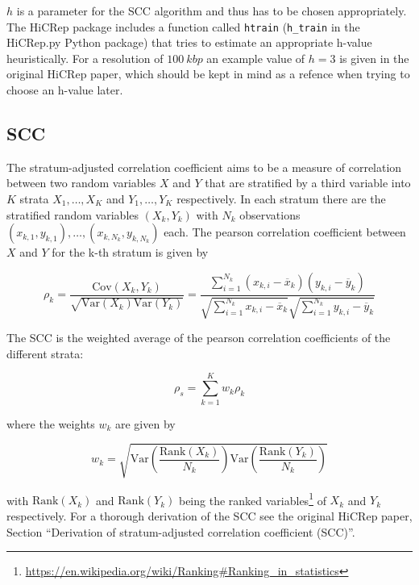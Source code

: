 \(h\) is a parameter for the SCC algorithm and thus has to be chosen appropriately. The HiCRep package includes a function called \verb|htrain| (\verb|h_train| in the HiCRep.py Python package) that tries to estimate an appropriate h-value heuristically. For a resolution of \(\SI{100}{kbp}\) an example value of \( h = 3 \) is given in the original HiCRep paper, which should be kept in mind as a refence when trying to choose an h-value later.


\subsection{SCC} %
\label{subsec:scc}

The stratum-adjusted correlation coefficient aims to be a measure of correlation between two random variables \(X\) and \(Y\) that are stratified by a third variable into \(K\) strata \(X_1, \dots, X_K\) and \(Y_1, \dots, Y_K\) respectively. In each stratum there are the stratified random variables \((X_k, Y_k)\) with \(N_k\) observations \( (x_{k,1}, y_{k,1}), \dots, (x_{k,N_k}, y_{k,N_k}) \) each. The pearson correlation coefficient between \(X\) and \(Y\) for the k-th stratum is given by

\[
  \rho_k = \frac{ \mathrm{Cov}(X_k,Y_k) }{ \sqrt{ \mathrm{Var}(X_k) \mathrm{Var}(Y_k)} } = \frac{ \sum_{i=1}^{N_k} (x_{k,i} - \overbar{x}_k) (y_{k,i} - \overbar{y}_k) }{ \sqrt{ \sum_{i=1}^{N_k} x_{k,i} - \overbar{x}_k } \sqrt{ \sum_{i=1}^{N_k} y_{k,i} - \overbar{y}_k } }
\]

The SCC is the weighted average of the pearson correlation coefficients of the different strata:

\[
  \rho_s = \sum_{k=1}^{K} w_k \rho_k
\]

where the weights \(w_k\) are given by

\[
  w_k = \sqrt{ \mathrm{Var}\left( \frac{ \mathrm{Rank}(X_k) }{ N_k } \right) \mathrm{Var}\left( \frac{ \mathrm{Rank}(Y_k) }{ N_k } \right) }
\]

with \( \mathrm{Rank}(X_k) \) and \( \mathrm{Rank}(Y_k) \) being the ranked variables\footnote{\url{https://en.wikipedia.org/wiki/Ranking\#Ranking_in_statistics}} of \(X_k\) and \(Y_k\) respectively. For a thorough derivation of the SCC see the original \mbox{HiCRep} paper\cite{yang_hicrep_2017}, Section \enquote{Derivation of stratum-adjusted correlation coefficient (SCC)}.


